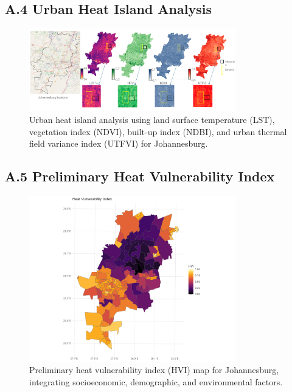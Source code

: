 \documentclass[12pt,a4paper,landscape]{article}
\begin{document}
\subsection*{A.4 Urban Heat Island Analysis}
\begin{figure}[H]
    \centering
    \includegraphics[width=0.8\textwidth]{images/heat_stress_LST_NDVI_NDBI_UTFVI_Johannesburg.png}
    \caption{Urban heat island analysis using land surface temperature (LST), vegetation index (NDVI), built-up index (NDBI), and urban thermal field variance index (UTFVI) for Johannesburg.}
    \label{fig:uhi}
\end{figure}

\subsection*{A.5 Preliminary Heat Vulnerability Index}
\begin{figure}[H]
    \centering
    \includegraphics[width=0.8\textwidth]{images/HVI_map_Johannesburg_prelim_analysis.png}
    \caption{Preliminary heat vulnerability index (HVI) map for Johannesburg, integrating socioeconomic, demographic, and environmental factors.}
    \label{fig:hvi}
\end{figure}
\end{document}
